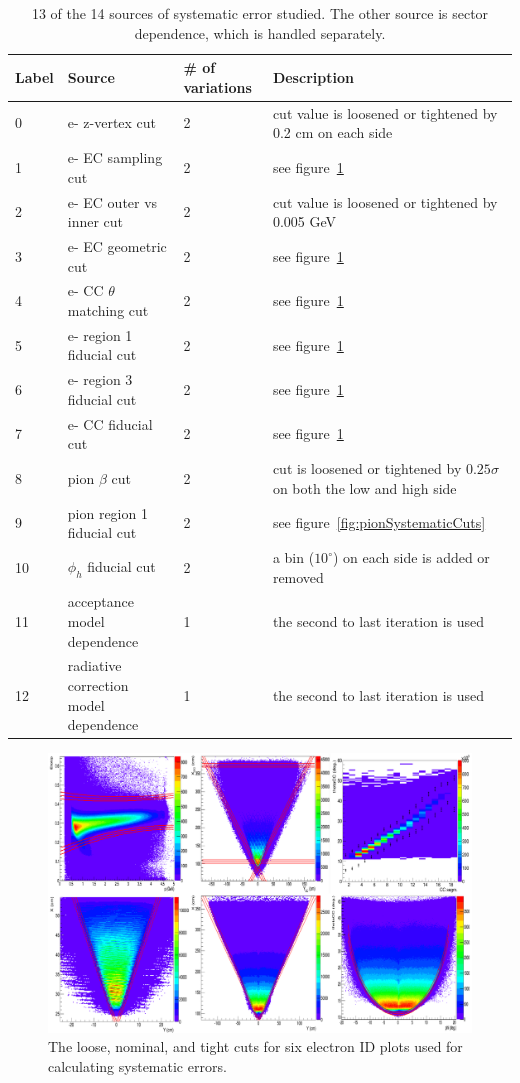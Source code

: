 \begin{table}[htp]
\centering
\begin{tabular}{ p{1.5cm} p{3cm} p{2cm} p{6cm} }
\hline
\textbf{Label} & \textbf{Source} & \textbf{\# of variations} & \textbf{Description}\\ \hline
0 & e- z-vertex cut & 2 & cut value is loosened or tightened by 0.2 cm on each side \\
1 & e- EC sampling cut & 2 & see figure~\ref{fig:eSystematicCuts} \\
2 & e- EC outer vs inner cut & 2 & cut value is loosened or tightened by 0.005 GeV \\
3 & e- EC geometric cut & 2 & see figure~\ref{fig:eSystematicCuts} \\
4 & e- CC $\theta$ matching cut & 2 & see figure~\ref{fig:eSystematicCuts} \\
5 & e- region 1 fiducial cut & 2 & see figure~\ref{fig:eSystematicCuts} \\
6 & e- region 3 fiducial cut & 2 & see figure~\ref{fig:eSystematicCuts} \\
7 & e- CC fiducial cut & 2 & see figure~\ref{fig:eSystematicCuts} \\
8 & pion $\beta$ cut & 2 & cut is loosened or tightened by $0.25\sigma$ on both the low and high side \\
9 & pion region 1 fiducial cut & 2 & see figure~\ref{fig:pionSystematicCuts} \\
10 & $\phi_h$ fiducial cut & 2 & a bin ($10^\circ$) on each side is added or removed \\
11 & acceptance model dependence & 1 & the second to last iteration is used \\
12 & radiative correction model dependence & 1 & the second to last iteration is used \\
\hline
\end{tabular}
\caption{13 of the 14 sources of systematic error studied. The other source is sector dependence, which is handled separately.}
\label{tab:sysErrorSources}
\end{table}
%
\begin{figure}
\centering
\includegraphics[width=8.5in]{figures/eSystematicCuts.png}
\caption{The loose, nominal, and tight cuts for six electron ID plots used for calculating systematic errors.}
\label{fig:eSystematicCuts}
\end{figure}
